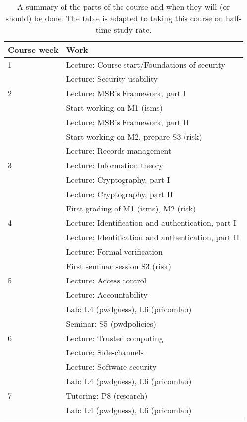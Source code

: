 \begin{table}
	\centering
  \caption{%
    A summary of the parts of the course and when they will (or should) be 
    done.
    The table is adapted to taking this course on half-time study rate.
  }\label{Schedule}
  \begin{tabular}{lp{9cm}}
    \toprule
    \textbf{Course week}	& \textbf{Work} \\
    \midrule
    1
    & Lecture: Course start/Foundations of security\\
    & Lecture: Security usability\\
    \midrule
    2
    & Lecture: MSB's Framework, part I\\
    & Start working on M1 (isms)\\
    & Lecture: MSB's Framework, part II\\
    & Start working on M2, prepare S3 (risk)\\
    & Lecture: Records management\\
    \midrule
    3
    & Lecture: Information theory\\
    & Lecture: Cryptography, part I\\
    & Lecture: Cryptography, part II\\
    & First grading of M1 (isms), M2 (risk)\\
    \midrule
    4
    & Lecture: Identification and authentication, part I\\
    & Lecture: Identification and authentication, part II\\
    & Lecture: Formal verification\\
    & First seminar session S3 (risk)\\
    \midrule
    5
    & Lecture: Access control\\
    & Lecture: Accountability\\
    & Lab: L4 (pwdguess), L6 (pricomlab)\\
    & Seminar: S5 (pwdpolicies)\\
    \midrule
    6
    & Lecture: Trusted computing\\
    & Lecture: Side-channels\\
    & Lecture: Software security\\
    & Lab: L4 (pwdguess), L6 (pricomlab)\\
    \midrule
    7
    & Tutoring: P8 (research)\\
    & Lab: L4 (pwdguess), L6 (pricomlab)\\

\end{tabular}
\end{table}
